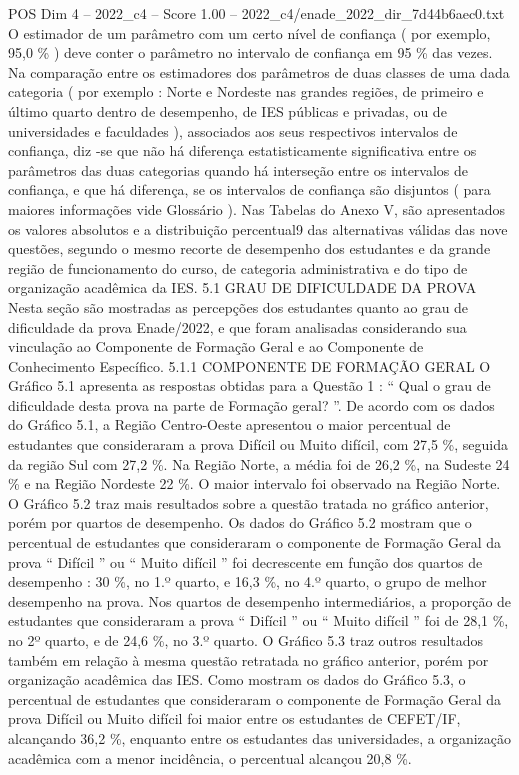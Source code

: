 \begin{textsample}{POS Dim 4 – 2022\_c4 – Score 1.00 – 2022\_c4/enade\_2022\_dir\_7d44b6aec0.txt}
O estimador de um parâmetro com um certo nível de confiança ( por exemplo, 95,0 \% ) deve conter o parâmetro no intervalo de confiança em 95 \% das vezes.
Na comparação entre os estimadores dos parâmetros de duas classes de uma dada categoria ( por exemplo : Norte e Nordeste nas grandes regiões, de primeiro e último quarto dentro de desempenho, de IES públicas e privadas, ou de universidades e faculdades ), associados aos seus respectivos intervalos de confiança, diz -se que não há diferença estatisticamente significativa entre os parâmetros das duas categorias quando há interseção entre os intervalos de confiança, e que há diferença, se os intervalos de confiança são disjuntos ( para maiores informações vide Glossário ).
Nas Tabelas do Anexo V, são apresentados os valores absolutos e a distribuição percentual9 das alternativas válidas das nove questões, segundo o mesmo recorte de desempenho dos estudantes e da grande região de funcionamento do curso, de categoria administrativa e do tipo de organização acadêmica da IES. 5.1 GRAU DE DIFICULDADE DA PROVA Nesta seção são mostradas as percepções dos estudantes quanto ao grau de dificuldade da prova Enade/2022, e que foram analisadas considerando sua vinculação ao Componente de Formação Geral e ao Componente de Conhecimento Específico. 5.1.1 COMPONENTE DE FORMAÇÃO GERAL O Gráfico 5.1 apresenta as respostas obtidas para a Questão 1 : “ Qual o grau de dificuldade desta prova na parte de Formação geral? ”.
De acordo com os dados do Gráfico 5.1, a Região Centro-Oeste apresentou o maior percentual de estudantes que consideraram a prova Difícil ou Muito difícil, com 27,5 \%, seguida da região Sul com 27,2 \%.
Na Região Norte, a média foi de 26,2 \%, na Sudeste 24 \% e na Região Nordeste 22 \%.
O maior intervalo foi observado na Região Norte.
O Gráfico 5.2 traz mais resultados sobre a questão tratada no gráfico anterior, porém por quartos de desempenho.
Os dados do Gráfico 5.2 mostram que o percentual de estudantes que consideraram o componente de Formação Geral da prova “ Difícil ” ou “ Muito difícil ” foi decrescente em função dos quartos de desempenho : 30 \%, no 1.º quarto, e 16,3 \%, no 4.º quarto, o grupo de melhor desempenho na prova.
Nos quartos de desempenho intermediários, a proporção de estudantes que consideraram a prova “ Difícil ” ou “ Muito difícil ” foi de 28,1 \%, no 2º quarto, e de 24,6 \%, no 3.º quarto.
O Gráfico 5.3 traz outros resultados também em relação à mesma questão retratada no gráfico anterior, porém por organização acadêmica das IES.
Como mostram os dados do Gráfico 5.3, o percentual de estudantes que consideraram o componente de Formação Geral da prova Difícil ou Muito difícil foi maior entre os estudantes de CEFET/IF, alcançando 36,2 \%, enquanto entre os estudantes das universidades, a organização acadêmica com a menor incidência, o percentual alcançou 20,8 \%.

\end{textsample}
